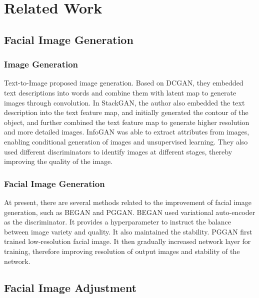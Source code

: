 \section{Related Work}

\subsection{Facial Image Generation}

\subsubsection*{Image Generation}

Text-to-Image proposed image generation.
Based on DCGAN, they embedded text descriptions into words and combine them with latent map to generate images through convolution.
In StackGAN, the author also embedded the text description into the text feature map,
    and initially generated the contour of the object,
    and further combined the text feature map to generate higher resolution and more detailed images.
InfoGAN was able to extract attributes from images, enabling conditional generation of images and unsupervised learning.
They also used different discriminators to identify images at different stages, thereby improving the quality of the image.


\subsubsection*{Facial Image Generation}

At present, there are several methods related to the improvement of facial image generation,
    such as BEGAN and PGGAN.
BEGAN used variational auto-encoder as the discriminator.
It provides a hyperparameter to instruct the balance between image variety and quality.
It also maintained the stability.
PGGAN first trained low-resolution facial image.
It then gradually increased network layer for training, 
therefore improving resolution of output images and stability of the network.



\subsection{Facial Image Adjustment}

